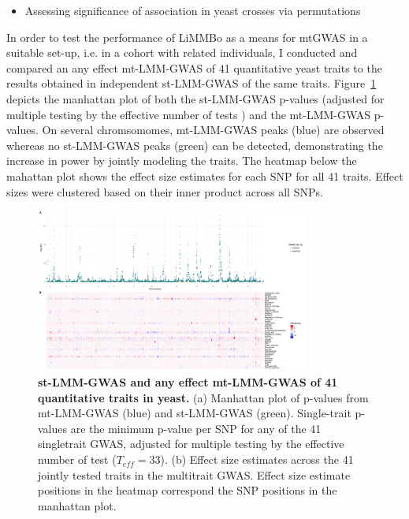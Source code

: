 \begin{itemize}
\item Assessing significance of association in yeast crosses via permutations \citep{Brehm2004, Ehrenreich2010}
\end{itemize} 
 
In order to test the performance of LiMMBo as a means for mtGWAS in a suitable set-up, i.e. in a cohort with related individuals, I conducted and compared an any effect mt-LMM-GWAS of 41 quantitative yeast traits to the results obtained in independent st-LMM-GWAS of the same traits. Figure~\ref{fig:GWAS-yeast} depicts the manhattan plot of both the st-LMM-GWAS p-values (adjusted for multiple testing by the effective number of tests \citep{Galwey2009}) and the mt-LMM-GWAS p-values. On several chromsomomes, mt-LMM-GWAS peaks (blue) are observed whereas no st-LMM-GWAS peaks (green) can be detected, demonstrating the increase in power by jointly modeling the traits. The heatmap below the mahattan plot shows the effect size estimates for each SNP for all 41 traits. Effect sizes were clustered based on their inner product across all SNPs. 
  \begin{figure}[hbtp]
	\centering
	\includegraphics[trim = 0mm 0mm 0mm 0mm, clip, width=0.8\textwidth]{Chapter1/Figures/ManhattanEffectsizes.pdf}
	\caption{\textbf{st-LMM-GWAS and any effect mt-LMM-GWAS of 41 quantitative traits in yeast.} (a) Manhattan plot of p-values from mt-LMM-GWAS (blue) and st-LMM-GWAS (green). Single-trait p-values are the minimum p-value per SNP for any of the 41 singletrait GWAS, adjusted for multiple testing by the effective number of test (\(T_{eff}=33\)). (b) Effect size estimates across the 41 jointly tested traits in the multitrait GWAS. Effect size estimate positions in the heatmap correspond the SNP positions in the manhattan plot.}
 	\label{fig:GWAS-yeast}
 	\end{figure}


